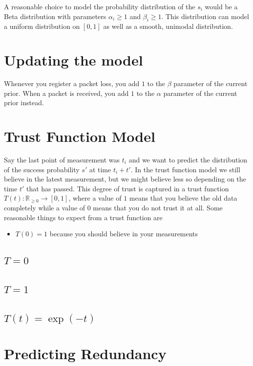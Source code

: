 \documentclass[10pt,a4paper]{article}
\begin{document}
A reasonable choice to model the probability distribution of the $s_{i}$ would be a Beta distribution with parameters $\alpha_{i} \ge 1$ and $\beta_{i} \ge 1$.
This distribution can model a uniform distribution on $[0, 1]$ as well as a smooth, unimodal distribution.

\section{Updating the model}

Whenever you register a packet loss, you add $1$ to the $\beta$ parameter of the current prior.
When a packet is received, you add $1$ to the $\alpha$ parameter of the current prior instead.

\section{Trust Function Model}\label{sec:trust_function}

Say the last point of measurement was $t_{i}$ and we want to predict the distribution of the success probability $s'$ at time $t_{i} + t'$.
In the trust function model we still believe in the latest measurement, but we might believe less so depending on the time $t'$ that has passed.
This degree of trust is captured in a trust function $T(t) : \mathbb{R}_{\ge 0} \rightarrow [0, 1]$, where a value of $1$ means that you believe the old data completely while a value of $0$ means that you do not trust it at all.
Some reasonable things to expect from a trust function are
\begin{itemize}
\item $T(0) = 1$ because you should believe in your measurements
\end{itemize}

\subsection{$T = 0$}

\subsection{$T = 1$}

\subsection{$T(t) = \exp(-t)$}

\section{Predicting Redundancy}
\end{document}
